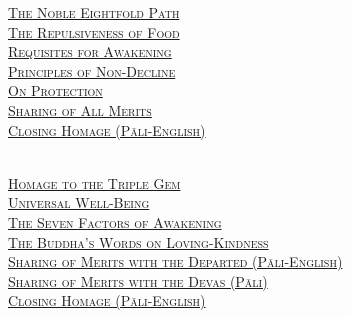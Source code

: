 \begin{center}
  \textsc{
    \hyperref[noble-eightfold-path]{The Noble Eightfold Path} \pageref{noble-eightfold-path}\\
    \hyperref[repulsiveness-of-food]{The Repulsiveness of Food} \pageref{repulsiveness-of-food}\\
    \hyperref[requisites-for-awakening]{Requisites for Awakening} \pageref{requisites-for-awakening}\\
    \hyperref[principles-of-non-decline]{Principles of Non-Decline} \pageref{principles-of-non-decline}\\
    \hyperref[protection]{On Protection} \pageref{protection}\\
    \hyperref[sharing-all-merits]{Sharing of All Merits} \pageref{sharing-all-merits}\\
    \hyperref[closing-homage]{Closing Homage (Pāli-English)}} \pageref{closing-homage}\\

  \clearpage

  {\libertinusFont\selectfont\textbf{\textsc{}}}\\

  \textsc{
    \hyperref[dedication-of-offerings]{Homage to the Triple Gem} \pageref{dedication-of-offerings}\\
    \hyperref[universal-well-being]{Universal Well-Being} \pageref{universal-well-being}\\
    \hyperref[seven-factors-of-awakening]{The Seven Factors of Awakening} \pageref{seven-factors-of-awakening}\\
    \hyperref[words-on-loving-kindness]{The Buddha's Words on Loving-Kindness} \pageref{words-on-loving-kindness}\\
    \hyperref[sharing-merits-departed]{Sharing of Merits with the Departed (Pāli-English)} \pageref{sharing-merits-departed}\\
    \hyperref[sharing-merits-devas]{Sharing of Merits with the Devas (Pāli)} \pageref{sharing-merits-devas}\\
    \hyperref[closing-homage]{Closing Homage (Pāli-English)}} \pageref{closing-homage}\\

  \bigskip

  {\libertinusFont\selectfont\textbf{\textsc{}}}\\


\end{center}
